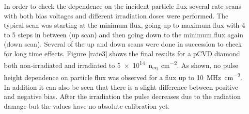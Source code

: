 
\noindent In order to check the dependence on the incident particle flux several rate scans with both bias voltages and different irradiation doses were performed. The typical scan was starting at the minimum flux, going up to maximum flux with 4 to 5 steps in between (up scan) and then going down to the minimum flux again (down scan). Several of the up and down scans were done in succession to check for long time effects. Figure \vref{rate3} shows the final results for a \ac{pCVD} diamond both non-irradiated and irradiated to \SI{5e14}{n_{eq}\per \centi\meter^2}. As shown, no pulse height dependence on particle flux was observed for a flux up to \SI{10}{\mega\hertz\per cm^2}. In addition it can also be seen that there is a slight difference between positive and negative bias. After the irradiation the pulse decreases due to the radiation damage but the values have no absolute calibration yet.

